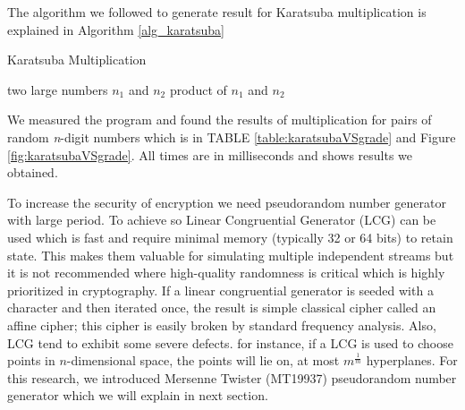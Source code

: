 \documentclass[conference]{IEEEtran}
\begin{document}
The algorithm we followed to generate result for Karatsuba multiplication is explained in Algorithm \ref{alg_karatsuba}
\begin{algorithm}                      %
\caption{Karatsuba Multiplication}          %
\label{alg_karatsuba}                           %
\begin{algorithmic}                    %
    \REQUIRE two large numbers $n_1$ and $n_2$
    \ENSURE product of $n_1$ and $n_2$

    \ENDIF
    
    \ELSE
    \ENDIF
    
    
    
\end{algorithmic}
\end{algorithm}
%	

We measured the program and found the results of multiplication for pairs of random \emph{n}-digit numbers which is in TABLE \ref{table:karatsubaVSgrade} and Figure \ref{fig:karatsubaVSgrade}. All times are in milliseconds and  shows results we obtained.

To increase the security of encryption we need pseudorandom number generator with large period. To achieve so Linear Congruential Generator (LCG)\cite{lcg_cryptography} can be used which is fast and require minimal memory (typically 32 or 64 bits) to retain state. This makes them valuable for simulating multiple independent streams but it is not recommended where high-quality randomness is critical which is highly prioritized in cryptography. If a linear congruential generator is seeded with a character and then iterated once, the result is simple classical cipher called an affine cipher\cite{affine_cipher}; this cipher is easily broken by standard frequency analysis. Also, LCG tend to exhibit some severe defects. for instance, if a LCG is used to choose points in $n$-dimensional space, the points will lie on, at most $m^{\frac{1}{m}}$ hyperplanes\cite{marsaglia_theorem}. For this research, we introduced Mersenne Twister (MT19937) pseudorandom number generator which we will explain in next section.
\end{document}
